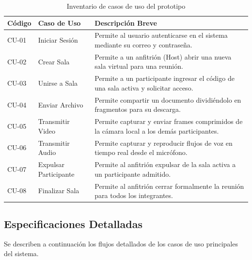 \documentclass[12pt,a4paper]{article}
\begin{document}
\begin{table}[H]
\centering
\small
\begin{tabular}{llp{9.5cm}}
\toprule
\textbf{C\'odigo} & \textbf{Caso de Uso} & \textbf{Descripci\'on Breve} \\
\midrule
CU-01 & Iniciar Sesi\'on & Permite al usuario autenticarse en el sistema mediante su correo y contrase\~na. \\
CU-02 & Crear Sala & Permite a un anfitri\'on (Host) abrir una nueva sala virtual para una reuni\'on. \\
CU-03 & Unirse a Sala & Permite a un participante ingresar el c\'odigo de una sala activa y solicitar acceso. \\
CU-04 & Enviar Archivo & Permite compartir un documento dividi\'endolo en fragmentos para su descarga. \\
CU-05 & Transmitir Video & Permite capturar y enviar frames comprimidos de la c\'amara local a los dem\'as participantes. \\
CU-06 & Transmitir Audio & Permite capturar y reproducir flujos de voz en tiempo real desde el micr\'ofono. \\
CU-07 & Expulsar Participante & Permite al anfitri\'on expulsar de la sala activa a un participante admitido. \\
CU-08 & Finalizar Sala & Permite al anfitri\'on cerrar formalmente la reuni\'on para todos los integrantes. \\
\bottomrule
\end{tabular}
\caption{Inventario de casos de uso del prototipo}
\end{table}

\subsection{Especificaciones Detalladas}
Se describen a continuaci\'on los flujos detallados de los casos de uso principales del sistema.
\end{document}
